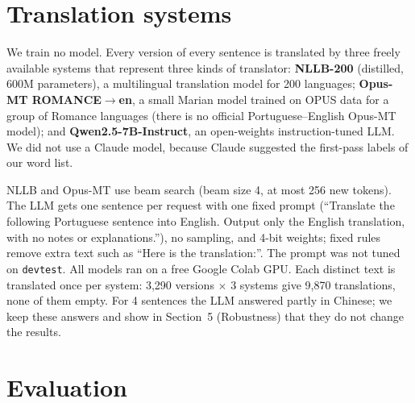 
\section{Translation systems}

We train no model. Every version of every sentence is translated by three freely available
systems that represent three kinds of translator:
\textbf{NLLB-200} (distilled, 600M parameters), a multilingual translation model for 200 languages;
\textbf{Opus-MT ROMANCE$\rightarrow$en}, a small Marian model trained on OPUS data for a group of
Romance languages (there is no official Portuguese--English Opus-MT model); and
\textbf{Qwen2.5-7B-Instruct}, an open-weights instruction-tuned LLM. We did not use a Claude model,
because Claude suggested the first-pass labels of our word list.

NLLB and Opus-MT use beam search (beam size 4, at most 256 new tokens). The LLM gets one sentence
per request with one fixed prompt (``Translate the following Portuguese sentence into English.
Output only the English translation, with no notes or explanations.''), no sampling, and 4-bit
weights; fixed rules remove extra text such as ``Here is the translation:''. The prompt was not tuned
on \texttt{devtest}. All models ran on a free Google Colab GPU. Each distinct text is translated once
per system: 3,290 versions $\times$ 3 systems give 9,870 translations, none of them empty. For 4
sentences the LLM answered partly in Chinese; we keep these answers and show in Section~5 (Robustness) that they do not change the results.

\section{Evaluation}

